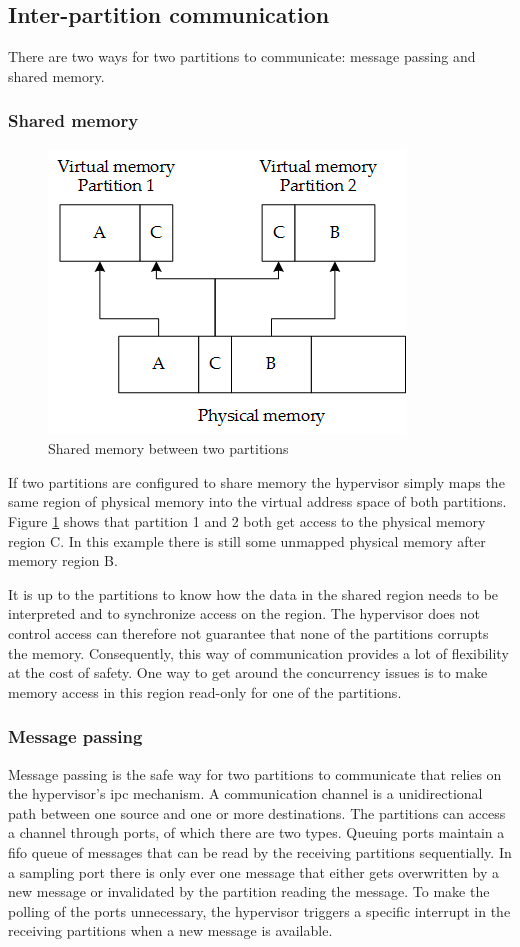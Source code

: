 \subsection{Inter-partition communication}
There are two ways for two partitions to communicate: message passing and shared memory.

\subsubsection{Shared memory}
\begin{figure}[hbt!]
\centering
\includegraphics[scale=0.75]{Figures/shared_memory.png}
\decoRule
\caption{Shared memory between two partitions}
\label{fig:shared_memory}
\end{figure}
If two partitions are configured to share memory the hypervisor simply maps the same region of physical memory into the virtual address space of both partitions. Figure \ref{fig:shared_memory} shows that partition 1 and 2 both get access to the physical memory region C. In this example there is still some unmapped physical memory after memory region B. 

It is up to the partitions to know how the data in the shared region needs to be interpreted and to synchronize access on the region. The hypervisor does not control access can therefore not guarantee that none of the partitions corrupts the memory. Consequently, this way of communication provides a lot of flexibility at the cost of safety.
One way to get around the concurrency issues is to make memory access in this region read-only for one of the partitions.

\subsubsection{Message passing}
Message passing is the safe way for two partitions to communicate that relies on the hypervisor's \acrshort{ipc} mechanism. A communication channel is a unidirectional path between one source and one or more destinations. The partitions can access a channel through ports, of which there are two types. Queuing ports maintain a \acrshort{fifo} queue of messages that can be read by the receiving partitions sequentially. In a sampling port there is only ever one message that either gets overwritten by a new message or invalidated by the partition reading the message. To make the polling of the ports unnecessary, the hypervisor triggers a specific interrupt in the receiving partitions when a new message is available.


